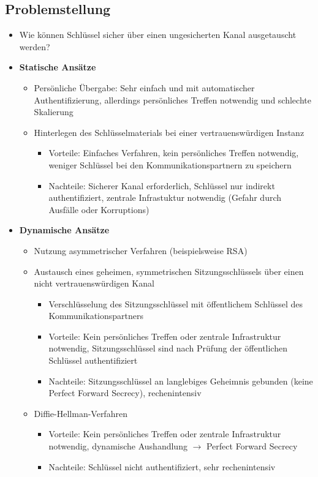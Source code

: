\subsection{Problemstellung}
\begin{itemize}
	\item Wie können Schlüssel sicher über einen ungesicherten Kanal ausgetauscht werden?
	\item \textbf{Statische Ansätze}
	\begin{itemize}
		\item Persönliche Übergabe: Sehr einfach und mit automatischer Authentifizierung, allerdings persönliches Treffen notwendig und schlechte Skalierung
		\item Hinterlegen des Schlüsselmaterials bei einer vertrauenswürdigen Instanz
		\begin{itemize}
			\item Vorteile: Einfaches Verfahren, kein persönliches Treffen notwendig, weniger Schlüssel bei den Kommunikationspartnern zu speichern
			\item Nachteile: Sicherer Kanal erforderlich, Schlüssel nur indirekt authentifiziert, zentrale Infrastuktur notwendig (Gefahr durch Ausfälle oder Korruptions)
		\end{itemize}
	\end{itemize}
	\item \textbf{Dynamische Ansätze}
	\begin{itemize}
		\item Nutzung asymmetrischer Verfahren (beispielsweise RSA)
		\item Austausch eines geheimen, symmetrischen Sitzungsschlüssels über einen nicht vertrauenswürdigen Kanal
		\begin{itemize}
			\item Verschlüsselung des Sitzungsschlüssel mit öffentlichem Schlüssel des Kommunikationspartners
			\item Vorteile: Kein persönliches Treffen oder zentrale Infrastruktur notwendig, Sitzungsschlüssel sind nach Prüfung der öffentlichen Schlüssel authentifiziert
			\item Nachteile: Sitzungsschlüssel an langlebiges Geheimnis gebunden (keine Perfect Forward Secrecy), rechenintensiv
		\end{itemize}
		\item Diffie-Hellman-Verfahren
		\begin{itemize}
			\item Vorteile: Kein persönliches Treffen oder zentrale Infrastruktur notwendig, dynamische Aushandlung \(\rightarrow\) Perfect Forward Secrecy
			\item Nachteile: Schlüssel nicht authentifiziert, sehr rechenintensiv
		\end{itemize}
	\end{itemize}
\end{itemize}


